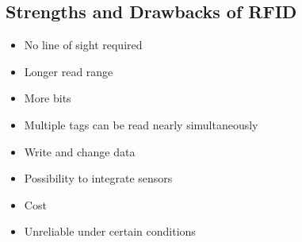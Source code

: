 \subsection{Strengths and Drawbacks of RFID}
\begin{mytitle} \hfill
\begin{itemize}
    \item No line of sight required
    \item Longer read range
    \item More bits
    \item Multiple tags can be read nearly simultaneously
    \item Write and change data
    \item Possibility to integrate sensors
\end{itemize}
\end{mytitle}
\begin{mytitle}\hfill
\begin{itemize}
    \item Cost
    \item Unreliable under certain conditions
\end{itemize}
\end{mytitle}
